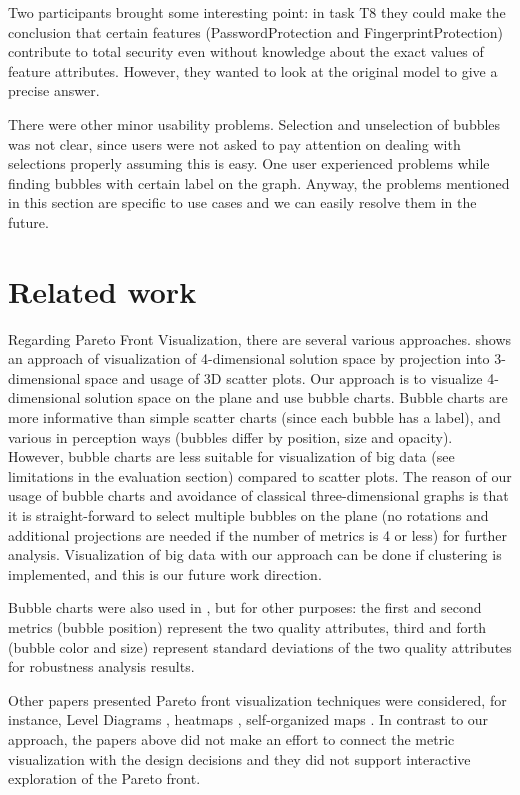 \documentclass{acm_proc_article-sp}
\begin{document}
Two participants brought some interesting point: in task T8 they could make the conclusion that certain features (PasswordProtection and FingerprintProtection) contribute to total security even without knowledge about the exact values of feature attributes. However, they wanted to look at the original model to give a precise answer. 

There were other minor usability problems. Selection and unselection of bubbles was not clear, since users were not asked to pay attention on dealing with selections properly assuming this is easy. One user experienced problems while finding bubbles with certain label on the graph. Anyway, the problems mentioned in this section are specific to use cases and we can easily resolve them in the future.

\section{Related work}

Regarding Pareto Front Visualization, there are several various approaches. \cite{Tusar:2011:VAS:2001576.2001677} shows an approach of visualization of 4-dimensional solution space by projection into 3-dimensional space and usage of 3D scatter plots. Our approach is to visualize 4-dimensional solution space on the plane and use bubble charts. Bubble charts are more informative than simple scatter charts (since each bubble has a label), and various in perception ways (bubbles differ by position, size and opacity). However,  bubble charts are less suitable for visualization of big data (see limitations in the evaluation section) compared to scatter plots. The reason of our usage of bubble charts and avoidance of classical three-dimensional graphs is that it is straight-forward to select multiple bubbles on the plane (no rotations and additional projections are needed if the number of metrics is 4 or less) for further analysis. Visualization of big data with our approach can be done if clustering is implemented, and this is our future work direction.

Bubble charts were also used in \cite{springerlink:10.1007/978-3-540-70928-2_48}, but for other purposes: the first and second metrics (bubble position) represent the two quality attributes, third and forth (bubble color and size) represent standard deviations of the two quality attributes for robustness analysis results. 

Other papers presented Pareto front visualization techniques were considered, for instance, Level Diagrams \cite{Blasco:2008:NGV:1401271.1401526}, heatmaps \cite{springerlink:10.1007/978-3-540-70928-2_29}, self-organized maps \cite{springerlink:10.1007/3-540-36970-8_56}. In contrast to our approach, the papers above did not make an effort to connect the metric visualization with the design decisions and they did not support interactive exploration of the Pareto front.
\end{document}
